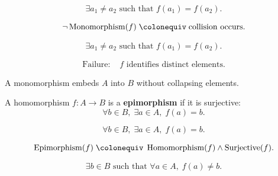 \begin{remark*}
\[
\exists a_1 \ne a_2 \text{ such that } f(a_1)=f(a_2).
\]
\end{remark*}

\begin{remark*}
\[
\neg \operatorname{Monomorphism}(f)
\;\colonequiv\;
\text{collision occurs}.
\]
\end{remark*}

\begin{remark*}
\[
\exists a_1 \ne a_2 \text{ such that } f(a_1)=f(a_2).
\]
\end{remark*}

\begin{remark*}
\[
\begin{aligned}
\text{Failure: } 
&f \text{ identifies distinct elements}.
\end{aligned}
\]
\end{remark*}

\begin{remark*}[Interpretation]
A monomorphism embeds $A$ into $B$ without collapsing elements.
\end{remark*}


\begin{tcolorbox}[title={Definition --- Epimorphism}]
\begin{definition}[Epimorphism]
\label{def:epimorphism}
A homomorphism $f : A \to B$ is a \textbf{epimorphism} if it is surjective:
\[
\forall b \in B,\; \exists a \in A,\; f(a)=b.
\]
\end{definition}
\end{tcolorbox}

\begin{remark*}
\[
\forall b \in B,\; \exists a \in A,\; f(a)=b.
\]
\end{remark*}

\begin{remark*}
\[
\operatorname{Epimorphism}(f)
\;\colonequiv\;
\operatorname{Homomorphism}(f)
\land
\operatorname{Surjective}(f).
\]
\end{remark*}

\begin{remark*}
\[
\exists b \in B \text{ such that } \forall a \in A,\; f(a)\ne b.
\]
\end{remark*}

